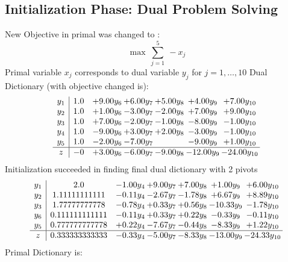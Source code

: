 \documentclass[8pt]{article}
\begin{document}
\subsection{Initialization Phase: Dual Problem Solving}
New Objective in primal was changed to : \[ \max\ \sum_{j=1}^{5}\ - x_j \] 
Primal variable $x_j$ corresponds to dual variable $y_j$ for $j = 1,\ldots,10$
Dual Dictionary (with objective changed is): 
\[\begin{array}{c| c c@{\hskip 2pt} c@{\hskip 2pt} c@{\hskip 2pt} c@{\hskip 2pt} c@{\hskip 2pt} }
 y_{1}   &  1.0 & +  9.00 y_{6} & +  6.00 y_{7} & +  5.00 y_{8} & +  4.00 y_{9} & +  7.00 y_{10}\\
 y_{2}   &  1.0 & +  1.00 y_{6} & -3.00 y_{7} & -2.00 y_{8} & +  7.00 y_{9} & +  9.00 y_{10}\\
 y_{3}   &  1.0 & +  7.00 y_{6} & -2.00 y_{7} & -1.00 y_{8} & -8.00 y_{9} & -1.00 y_{10}\\
 y_{4}   &  1.0 & -9.00 y_{6} & +  3.00 y_{7} & +  2.00 y_{8} & -3.00 y_{9} & -1.00 y_{10}\\
 y_{5}   &  1.0 & -2.00 y_{6} & -7.00 y_{7} &   & -9.00 y_{9} & +  1.00 y_{10}\\
\hline
z    &  -0 & +  3.00 y_{6} & -6.00 y_{7} & -9.00 y_{8} & -12.00 y_{9} & -24.00 y_{10}\\
\end{array}\]
Initialization succeeded in finding final dual dictionary with 2 pivots
\[\begin{array}{c| c c@{\hskip 2pt} c@{\hskip 2pt} c@{\hskip 2pt} c@{\hskip 2pt} c@{\hskip 2pt} }
 y_{1}   &  2.0 & -1.00 y_{4} & +  9.00 y_{7} & +  7.00 y_{8} & +  1.00 y_{9} & +  6.00 y_{10}\\
 y_{2}   &  1.11111111111 & -0.11 y_{4} & -2.67 y_{7} & -1.78 y_{8} & +  6.67 y_{9} & +  8.89 y_{10}\\
 y_{3}   &  1.77777777778 & -0.78 y_{4} & +  0.33 y_{7} & +  0.56 y_{8} & -10.33 y_{9} & -1.78 y_{10}\\
 y_{6}   &  0.111111111111 & -0.11 y_{4} & +  0.33 y_{7} & +  0.22 y_{8} & -0.33 y_{9} & -0.11 y_{10}\\
 y_{5}   &  0.777777777778 & +  0.22 y_{4} & -7.67 y_{7} & -0.44 y_{8} & -8.33 y_{9} & +  1.22 y_{10}\\
\hline
z    &  0.333333333333 & -0.33 y_{4} & -5.00 y_{7} & -8.33 y_{8} & -13.00 y_{9} & -24.33 y_{10}\\
\end{array}\]
Primal Dictionary is:
\end{document}
